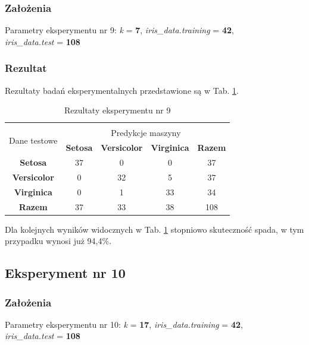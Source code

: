 \documentclass[12pt]{article}
\begin{document}
\subsubsection{Założenia}

Parametry eksperymentu nr 9: \textit{k} = \textbf{7}, \textit{iris\_data.training} = \textbf{42}, \\ \textit{iris\_data.test} = \textbf{108}

\subsubsection{Rezultat}

Rezultaty badań eksperymentalnych przedstawione są w Tab. \ref{wyniki9}.
\begin{table}[ht!]
 \centering
 \vspace{0.2cm}
  \begin{tabular}{|*{5}{c|}}
  \hline\\[-0.5cm]
   \multirow{2}{*}{Dane testowe} & \multicolumn{4}{c|}{Predykcje maszyny} \\ \cline{2-5}
   & \textbf{Setosa} & \textbf{Versicolor} & \textbf{Virginica} & \textbf{Razem}\\
  \hline
   \textbf{Setosa} & 37 & 0 & 0 & 37  \\ \hline
   \textbf{Versicolor} & 0 & 32 & 5 & 37  \\ \hline
   \textbf{Virginica} & 0 &  1 & 33 & 34  \\ \hline
   \textbf{Razem} & 37 & 33 & 38 & 108 \\
  \hline
 \end{tabular}
 \caption{Rezultaty eksperymentu nr 9}
 \label{wyniki9}
\end{table}

\noindent Dla kolejnych wyników widocznych w Tab. \ref{wyniki9} stopniowo skuteczność spada, w tym przypadku wynosi już 94,4\%. \newline

\subsection{Eksperyment nr 10}
\subsubsection{Założenia}

Parametry eksperymentu nr 10: \textit{k} = \textbf{17}, \textit{iris\_data.training} = \textbf{42}, \\ \textit{iris\_data.test} = \textbf{108}
\end{document}
